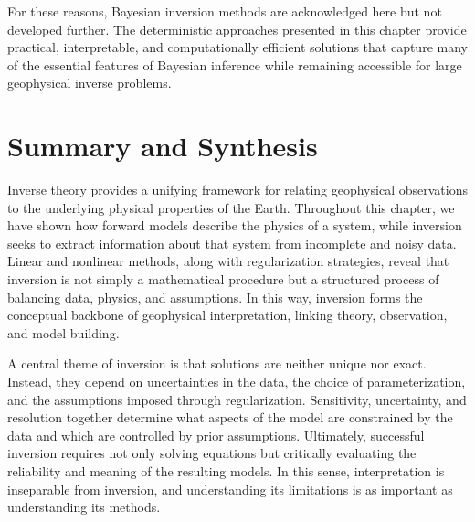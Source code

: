 For these reasons, Bayesian inversion methods are acknowledged here but not developed further. The deterministic approaches presented in this chapter provide practical, interpretable, and computationally efficient solutions that capture many of the essential features of Bayesian inference while remaining accessible for large geophysical inverse problems.

\section{Summary and Synthesis}

Inverse theory provides a unifying framework for relating geophysical observations to the underlying physical properties of the Earth. Throughout this chapter, we have shown how forward models describe the physics of a system, while inversion seeks to extract information about that system from incomplete and noisy data. Linear and nonlinear methods, along with regularization strategies, reveal that inversion is not simply a mathematical procedure but a structured process of balancing data, physics, and assumptions. In this way, inversion forms the conceptual backbone of geophysical interpretation, linking theory, observation, and model building.

A central theme of inversion is that solutions are neither unique nor exact. Instead, they depend on uncertainties in the data, the choice of parameterization, and the assumptions imposed through regularization. Sensitivity, uncertainty, and resolution together determine what aspects of the model are constrained by the data and which are controlled by prior assumptions. Ultimately, successful inversion requires not only solving equations but critically evaluating the reliability and meaning of the resulting models. In this sense, interpretation is inseparable from inversion, and understanding its limitations is as important as understanding its methods.

\nocite{Aster_etal2013}

\FloatBarrier


